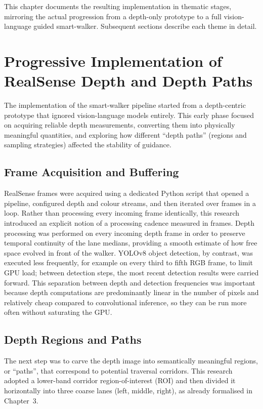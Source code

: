 \documentclass[11pt,a4paper]{article}
\begin{document}
This chapter documents the resulting implementation in thematic stages, mirroring the actual progression from a depth-only prototype to a full vision-language guided smart-walker. Subsequent sections describe each theme in detail.

\section{Progressive Implementation of RealSense Depth and Depth Paths}

The implementation of the smart-walker pipeline started from a depth-centric prototype that ignored vision-language models entirely. This early phase focused on acquiring reliable depth measurements, converting them into physically meaningful quantities, and exploring how different ``depth paths'' (regions and sampling strategies) affected the stability of guidance.

\subsection{Frame Acquisition and Buffering}

RealSense frames were acquired using a dedicated Python script that opened a pipeline, configured depth and colour streams, and then iterated over frames in a loop. Rather than processing every incoming frame identically, this research introduced an explicit notion of a processing cadence measured in frames. Depth processing was performed on every incoming depth frame in order to preserve temporal continuity of the lane medians, providing a smooth estimate of how free space evolved in front of the walker. YOLOv8 object detection, by contrast, was executed less frequently, for example on every third to fifth RGB frame, to limit GPU load; between detection steps, the most recent detection results were carried forward. This separation between depth and detection frequencies was important because depth computations are predominantly linear in the number of pixels and relatively cheap compared to convolutional inference, so they can be run more often without saturating the GPU.

\subsection{Depth Regions and Paths}

The next step was to carve the depth image into semantically meaningful regions, or ``paths'', that correspond to potential traversal corridors. This research adopted a lower-band corridor region-of-interest (ROI) and then divided it horizontally into three coarse lanes (left, middle, right), as already formalised in Chapter~3.
\end{document}
